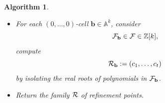 \documentclass[
]{book}
\newtheorem{algorithm}{Algorithm}
\theoremstyle{definition}
\theoremstyle{definition}
\theoremstyle{definition}
\theoremstyle{definition}
\theoremstyle{remark}
\begin{document}
\begin{algorithm}
\begin{itemize}
\begin{itemize}
    \begin{itemize}
    \item
      Let \(\rm{sub}_{\mathbf{b}} (g_j) \in \mathbb{Z}[x_{k+1,\ldots,x_j}]\) be such that \(g_\alpha(\mathbf{x}) = 0\) for all \(\mathbf{x} \in C'_\delta\).
    \item
      Compute
      \[
      f_\delta := \det\begin{pmatrix}\dfrac{\partial g_{k+1}}{\partial x_{k}} & \cdots & \dfrac{\partial g_{j-1}}{\partial x_{k}} & \dfrac{\partial g_{j}}{\partial x_{k}}\\
      \vdots &  &  & \vdots\\
      \dfrac{\partial g_{k+1}}{\partial x_{j-1}} & \cdots & \dfrac{\partial g_{j-1}}{\partial x_{j-1}} & \dfrac{\partial g_{j}}{\partial x_{j-1}}
      \end{pmatrix},
      \]
      from Equation \eqref{eq:jacobi-det}, using constraints \(g_{k+1},\ldots,g_{\alpha+1}\), and discarding denominators \(\partial g_\alpha / \partial x_\alpha\) of the total derivatives in the last column.
    \end{itemize}
  \item
    Let \[{\cal H} := \{ g_{k+1},\ldots,g_{j-1}, f_B, f_T \}\]
    be a set of polynomials and compute
    \[
    {\cal F}_{\mathbf{b}} := {\cal F}_{\mathbf{b}} \cup {\operatorname{proj}_{\mathbb{R}^{1}}}({\cal H}) \subset \mathbb{Z}[x_k].
    \]
  \item
    If \(j < n\), then

    \begin{itemize}
    \item
      Add \(g_j\) to \(\cal G\), i.e., let
      \[
      {\cal G} := {\cal G} \cup \{ g_j \}.
      \]
    \item
      Let \(j := j+1\).
    \item
      Let
      \[
      C' := {\operatorname{proj}_{\mathbb{R}^{j}}}(C)
      \]
      \(C'\) is a section cell, and its top and bottom may not be graphs of continuous functions. Use QE to compute
      \[
      ...
      \]
    \end{itemize}
  \end{itemize}
\item
  For each \((0,\ldots,0)\)-cell \(\mathbf{b} \in \mathbb{A}^k\), consider
  \[
  {\cal F}_{\mathbf{b}} \in {\cal F} \in \mathbb{Z}[k],
  \]
  compute
  \[
  {\cal R}_{\mathbf{b}} := (c_1,\ldots,c_t)
  \]
  by isolating the real roots of polynomials in \({\cal F}_{\mathbf{b}}\).
\item
  Return the family \({\cal R}\) of refinement points.
\end{itemize}

\end{algorithm}
\end{document}
